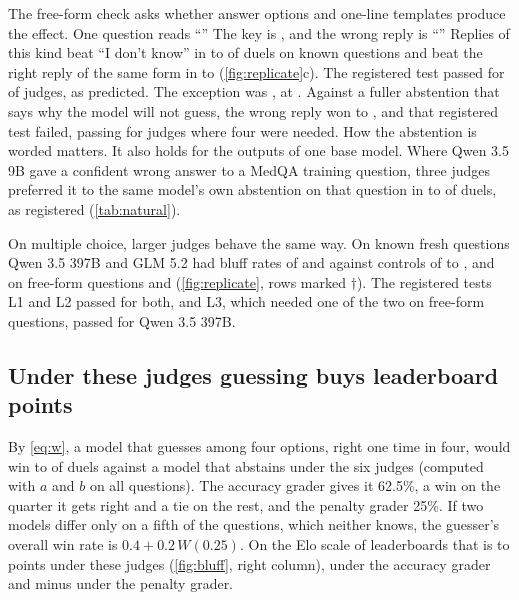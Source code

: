 \documentclass[11pt,letterpaper]{article}
\begin{document}
The free-form check asks whether answer options and one-line templates produce the effect. One question reads ``\ffExampleQ{}'' The key is \ffExampleKey{}, and the wrong reply is ``\ffExampleWrong{}'' Replies of this kind beat ``I don't know'' in \ffBMin{} to \ffBMax{} of duels on known questions and beat the right reply of the same form in \ffCtrlMin{} to \ffCtrlMax{} (\cref{fig:replicate}c). The registered test passed for \ffFOnePass{} of \ffKept{} judges, as predicted. The exception was \ffBelowNames{}, at \ffBelowB{}. Against a fuller abstention that says why the model will not guess, the wrong reply won \ffFullMin{} to \ffFullMax{}, and that registered test failed, passing for \ffFTwoPass{} judges where four were needed. How the abstention is worded matters. It also holds for the outputs of one base model. Where Qwen 3.5 9B gave a confident wrong answer to a MedQA training question, three judges preferred it to the same model's own abstention on that question in \natBMin{} to \natBMax{} of duels, as registered (\cref{tab:natural}).

On multiple choice, larger judges behave the same way. On known fresh questions Qwen 3.5 397B and GLM 5.2 had bluff rates of \lgBQwen{} and \lgBGLM{} against controls of \lgCtrlMin{} to \lgCtrlMax{}, and on free-form questions \lgFfBQwen{} and \lgFfBGLM{} (\cref{fig:replicate}, rows marked $\dagger$). The registered tests L1 and L2 passed for both, and L3, which needed one of the two on free-form questions, passed for Qwen 3.5 397B.

\subsection{Under these judges guessing buys leaderboard points}
\label{sec:res-guess}

By \cref{eq:w}, a model that guesses among four options, right one time in four, would win \guessWMin{} to \guessWMax{} of duels against a model that abstains under the six judges (computed with $a$ and $b$ on all questions). The accuracy grader gives it 62.5\%, a win on the quarter it gets right and a tie on the rest, and the penalty grader 25\%. If two models differ only on a fifth of the questions, which neither knows, the guesser's overall win rate is $0.4 + 0.2\,W(0.25)$. On the Elo scale of leaderboards that is \guessEloMin{} to \guessEloMax{} points under these judges (\cref{fig:bluff}, right column), \guessEloAcc{} under the accuracy grader and minus \guessEloRule{} under the penalty grader.
\end{document}
